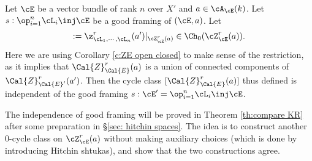 %



\begin{defn-prop}\label{defn:general KR} Let $\cE$ be a vector bundle of rank $n$ over $X'$ and $a\in \cA_{\cE}(k)$. Let $s:\op_{i=1}^{n}\cL_{i}\inj \cE$ be a good framing of $(\cE,a)$. Let
\begin{equation}
[\Cal{Z}^{r}_{\Cal{E}}(a)]:=\z^r_{\cL_{1},\cdots, \cL_{n}}(a')|_{\cZ^{r}_{\cE}(a)}\in \Ch_{0}(\cZ_{\cE}^{r}(a)).
\end{equation}
Here we are using Corollary \ref{c:ZE open closed} to make sense of the restriction, as it implies that $\Cal{Z}^{r}_{\Cal{E}}(a)$ is a union of connected components of $\Cal{Z}^{r}_{\Cal{E}'}(a')$. Then the cycle class $[\Cal{Z}^{r}_{\Cal{E}}(a)]$ thus defined is independent of the good framing $s:\cE'=\op_{i=1}^{n}\cL_{i}\inj \cE$.
\end{defn-prop}
The independence of good framing  will be proved in Theorem \ref{th:compare KR} after some preparation in \S\ref{sec: hitchin spaces}. The idea is to construct another $0$-cycle class on $\cZ^{r}_{\cE}(a)$ without making auxiliary choices (which is done by introducing Hitchin shtukas), and show that the two constructions agree.

